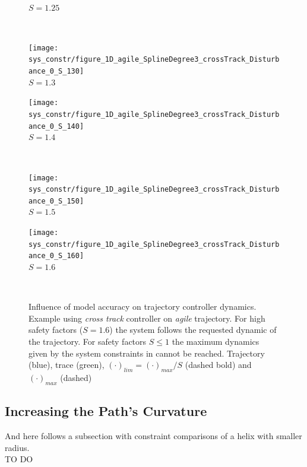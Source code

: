 \begin{figure}[H]
\begin{minipage}[t]{0.48\textwidth}
  \\ $S=1.25$
  \end{minipage}\\ \hspace{5pt}
  \begin{minipage}[t]{0.48\textwidth}
    \centering
    \texttt{[image: sys\_constr/figure\_1D\_agile\_SplineDegree3\_crossTrack\_Disturbance\_0\_S\_130]}
  \\ $S=1.3$
  \end{minipage}
  \begin{minipage}[t]{0.48\textwidth}
    \centering
    \texttt{[image: sys\_constr/figure\_1D\_agile\_SplineDegree3\_crossTrack\_Disturbance\_0\_S\_140]}
  \\ $S=1.4$
  \end{minipage}\\ \hspace{5pt}
  \begin{minipage}[t]{0.48\textwidth}
    \centering
    \texttt{[image: sys\_constr/figure\_1D\_agile\_SplineDegree3\_crossTrack\_Disturbance\_0\_S\_150]}
  \\ $S=1.5$
  \end{minipage}
  \begin{minipage}[t]{0.48\textwidth}
    \centering
    \texttt{[image: sys\_constr/figure\_1D\_agile\_SplineDegree3\_crossTrack\_Disturbance\_0\_S\_160]}
  \\ $S=1.6$
  \end{minipage} \\
  \label{fig:app_sys_constr}
  \caption{Influence of model accuracy on trajectory controller dynamics. Example using \textit{cross track} controller on \textit{agile} trajectory. For high safety factors ($S=1.6$) the system follows the requested dynamic of the trajectory. For safety factors $S\leq 1$ the maximum dynamics given by the system constraints in \cite{weichart} cannot be reached. Trajectory (blue), trace (green), $(\cdot)_{lim}=(\cdot)_{max}/S$ (dashed bold) and $(\cdot)_{max}$ (dashed)}
\end{figure}



\subsection{Increasing the Path's Curvature}
\label{sub:app_increasing_curvature}
And here follows a subsection with constraint comparisons of a helix with smaller radius.
\\
TO DO
\\


